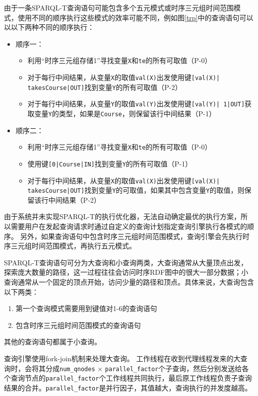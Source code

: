 由于一条SPARQL-T查询语句可能包含多个五元模式或时序三元组时间范围模式，使用不同的顺序执行这些模式的效率可能不同，例如图\ref{trp}中的查询语句可以以以下两种不同的顺序执行：
\begin{itemize}
    \item 顺序一：
    \begin{itemize}
        \item 利用“时序三元组存储1”寻找变量\texttt{X}和\texttt{te}的所有可取值（P-0）
        \item 对于每行中间结果，从变量\texttt{X}的取值\texttt{val(X)}出发使用键\texttt{[val(X)| takesCourse|OUT]}找到变量\texttt{Y}的所有可取值（P-2）
        \item 对于每行中间结果，从变量\texttt{Y}的取值\texttt{val(Y)}出发使用键\texttt{[val(Y)| 1|OUT]}获取变量\texttt{Y}的类型，如果是\texttt{Course}，则保留该行中间结果（P-1）
    \end{itemize}
    \item 顺序二：
    \begin{itemize}
        \item 利用“时序三元组存储1”寻找变量\texttt{X}和\texttt{te}的所有可取值（P-0）
        \item 使用键\texttt{[0|Course|IN]}找到变量\texttt{Y}的所有可取值（P-1）
        \item 对于每行中间结果，从变量\texttt{X}的取值\texttt{val(X)}出发使用键\texttt{[val(X)| takesCourse|OUT]}找到变量\texttt{Y}的可取值，如果其中包含变量\texttt{Y}的取值，则保留该行中间结果（P-2）
    \end{itemize}
\end{itemize}

由于系统并未实现SPARQL-T的执行优化器，无法自动确定最优的执行方案，所以需要用户在发起查询请求时通过自定义的查询计划指定查询引擎执行各模式的顺序。
另外，如果查询语句中包含时序三元组时间范围模式，查询引擎会先执行时序三元组时间范围模式，再执行五元模式。

SPARQL-T查询语句可分为大查询和小查询两类，大查询通常从大量顶点出发，探索庞大数量的路径，这一过程往往会访问时序RDF图中的很大一部分数据；小查询通常从一个固定的顶点开始，访问少量的路径和顶点。具体来说，大查询包含以下两类：
\begin{enumerate}
    \item 第一个查询模式需要用到键值对1-6的查询语句
    \item 包含时序三元组时间范围模式的查询语句
\end{enumerate}
其他的查询语句都属于小查询。

查询引擎使用fork-join机制来处理大查询。
工作线程在收到代理线程发来的大查询时，会将其分成\texttt{num\_qnodes} $\times$ \texttt{parallel\_factor}个子查询，然后分别发送给各个查询节点的\texttt{parallel\_factor}个工作线程共同执行，最后原工作线程负责子查询结果的合并。\texttt{parallel\_factor}是并行因子，其值越大，查询执行的并发度越高。

